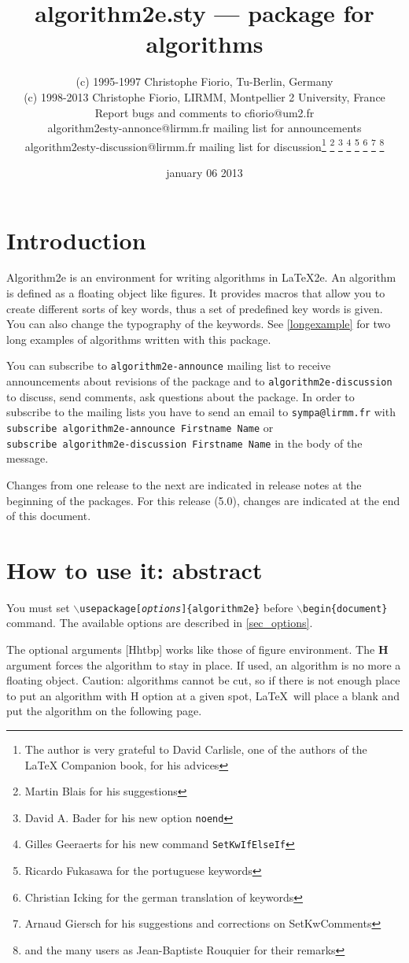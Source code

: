 \documentclass[a4paper]{article}
\title{algorithm2e.sty --- package for algorithms\\ {\large\algocfversion}}
\author{(c) 1995-1997 Christophe Fiorio, Tu-Berlin, Germany\\
(c) 1998-2013 Christophe Fiorio, LIRMM, Montpellier 2 University, France\\
  Report bugs and comments to cfiorio@um2.fr\\
  algorithm2esty-annonce@lirmm.fr mailing list for announcements\\
  algorithm2esty-discussion@lirmm.fr mailing list for discussion\thanks{The author is very grateful
    to David Carlisle, one of the authors of the LaTeX Companion book, for his advices} \thanks{Martin Blais for his
    suggestions} \thanks{David A. Bader for his new option
    \texttt{noend}} \thanks{Gilles Geeraerts for his new
    command \texttt{SetKwIfElseIf}} \thanks{Ricardo Fukasawa for the portuguese keywords} \thanks{Christian Icking 
  for the german translation of keywords} 
  \thanks{Arnaud Giersch for his suggestions and corrections on SetKwComments}
\thanks{and the many users as Jean-Baptiste Rouquier
  for their remarks} } \date{january 06 2013}
\begin{document}
\maketitle
\vspace{-0.5cm}

\tableofcontents
\clearpage

\section{Introduction}

Algorithm2e is an environment for writing algorithms in \LaTeX2e{}.  An algorithm is defined as a floating object
like figures.  It provides macros that allow you to create different sorts of key words, thus a set of predefined
key words is given. You can also change the typography of the keywords. See \autoref{longexample} for two long
examples of algorithms written with this package.


You can subscribe to \texttt{algorithm2e-announce} mailing list to receive
announcements about revisions of the package and to
\texttt{algorithm2e-discussion} to discuss, send comments,
ask questions about the package.
\makeatletter
In order to subscribe to the mailing lists you have to send an email to
\texttt{sympa@lirmm.fr} with \texttt{subscribe algorithm2e-announce Firstname
  Name} or\\\texttt{subscribe algorithm2e-discussion Firstname
  Name} in the body of the message.\makeatother

Changes from one release to the next are indicated in release notes at the beginning of the packages. For this
release (5.0), changes are indicated at the end of this document.

\section{How to use it: abstract}

You must set
\texttt{$\backslash$usepackage[\emph{options}]\{algorithm2e\}} before 
\texttt{$\backslash$begin\{document\}} command. The available options
are described in \autoref{sec_options}.


The optional arguments [Hhtbp] works like those of figure environment.  The
\textbf{H} argument forces the algorithm to stay in place. If used, an algorithm
is no more a floating object.  Caution: algorithms cannot be cut, so if there is
not enough place to put an algorithm with H option at a given spot, \LaTeX\ will
place a blank and put the algorithm on the following page.
\end{document}
